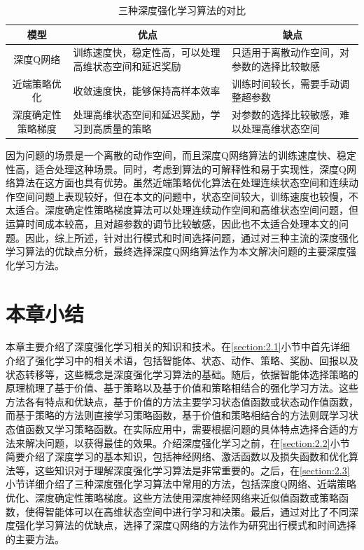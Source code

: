 \renewcommand{\arraystretch}{1.5} %
\begin{table}[htbp]
\centering
\caption{三种深度强化学习算法的对比}
\label{tab:2_1}
\begin{tabular}{cll}
\toprule
模型 & \multicolumn{1}{c}{优点}       & \multicolumn{1}{c}{缺点}     \\
\midrule
深度Q网络                       & \parbox[t]{5.5cm}{训练速度快，稳定性高，可以处理高维状态空间和延迟奖励}      & \parbox[t]{5.5cm}{只适用于离散动作空间，对参数的选择比较敏感 }                       \\
近端策略优化                       & \parbox[t]{5.5cm}{收敛速度快，能够保持高样本效率}    & \parbox[t]{5.5cm}{训练时间较长，需要手动调整超参数}              \\ 
深度确定性策略梯度                    & \parbox[t]{5.5cm}{处理高维状态空间和延迟奖励，学习到高质量的策略}   & \parbox[t]{5.5cm}{对参数的选择比较敏感，难以处理高维状态空间}              \\
\bottomrule
\end{tabular}
\end{table}



因为问题的场景是一个离散的动作空间，而且深度Q网络算法的训练速度快、稳定性高，适合处理这种场景。同时，考虑到算法的可解释性和易于实现性，深度Q网络算法在这方面也具有优势。虽然近端策略优化算法在处理连续状态空间和连续动作空间问题上表现较好，但在本文的问题中，状态空间较大，训练速度也较慢，不太适合。深度确定性策略梯度算法可以处理连续动作空间和高维状态空间问题，但运算时间成本较高，且对超参数的调节比较敏感，因此也不太适合处理本文的问题。因此，综上所述，针对出行模式和时间选择问题，通过对三种主流的深度强化学习算法的优缺点分析，最终选择深度Q网络算法作为本文解决问题的主要深度强化学习方法。

\section{本章小结}

本章主要介绍了深度强化学习相关的知识和技术。在\ref{section:2.1}小节中首先详细介绍了强化学习中的相关术语，包括智能体、状态、动作、策略、奖励、回报以及状态转移等，这些概念是深度强化学习算法的基础。随后，依据智能体选择策略的原理梳理了基于价值、基于策略以及基于价值和策略相结合的强化学习方法。这些方法各有特点和优缺点，基于价值的方法主要学习状态值函数或状态动作值函数，而基于策略的方法则直接学习策略函数，基于价值和策略相结合的方法则既学习状态值函数又学习策略函数。在实际应用中，需要根据问题的具体特点选择合适的方法来解决问题，以获得最佳的效果。介绍深度强化学习之前，在\ref{section:2.2}小节简要介绍了深度学习的基本知识，包括神经网络、激活函数以及损失函数和优化算法等，这些知识对于理解深度强化学习算法是非常重要的。之后，在\ref{section:2.3}小节详细介绍了三种深度强化学习算法中常用的方法，包括深度Q网络、近端策略优化、深度确定性策略梯度。这些方法使用深度神经网络来近似值函数或策略函数，使得智能体可以在高维状态空间中进行学习和决策。最后，通过对比了不同深度强化学习算法的优缺点，选择了深度Q网络的方法作为研究出行模式和时间选择的主要方法。